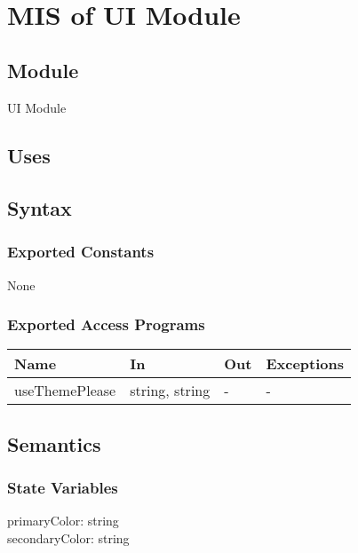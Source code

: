\documentclass[12pt, titlepage]{article}
\begin{document}
\newpage
~\newpage

\section{MIS of UI Module} \label{mUI}

\subsection{Module}

UI Module

\subsection{Uses}


\subsection{Syntax}

\subsubsection{Exported Constants}

None

\subsubsection{Exported Access Programs}

\begin{center}
\begin{tabular}{p{4cm} p{4cm} p{4cm} p{2cm}}
\hline
\textbf{Name} & \textbf{In} & \textbf{Out} & \textbf{Exceptions} \\
\hline
useThemePlease & string, string & - & - \\
\hline
\end{tabular}
\end{center}

\subsection{Semantics}

\subsubsection{State Variables}

primaryColor: string \\
secondaryColor: string
\end{document}
